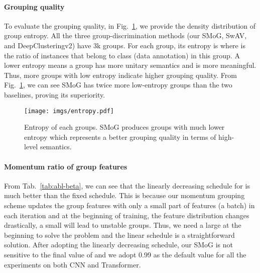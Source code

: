 \documentclass[runningheads]{style/llncs}
\begin{document}
\paragraph{Grouping quality} To evaluate the grouping quality, in Fig.~\ref{fig:entropy}, we provide the density distribution of group entropy. All the three group-discrimination methods (our SMoG, SwAV, and DeepClusteringv2) have 3k groups. For each group, its entropy is  where  is the ratio of instances that belong to class  (data annotation) in this group. A lower entropy means a group has more unitary semantics and is more meaningful. Thus, more groups with low entropy indicate higher grouping quality. From Fig.~\ref{fig:entropy}, we can see SMoG has twice more low-entropy groups than the two baselines, proving its superiority.

\begin{figure}
	\begin{center}
		\texttt{[image: imgs/entropy.pdf]}
	\end{center}
	\caption{Entropy of each groups. SMoG produces groups with much lower entropy which represents a better grouping quality in terms of high-level semantics.}
	\label{fig:entropy}
\end{figure}

\paragraph{Momentum ratio  of group features}
From Tab.~\ref{tab:abl-beta}, we can see that the linearly decreasing schedule for  is much better than the fixed schedule. This is because our momentum grouping scheme updates the group features with only a small part of features (a batch) in each iteration and at the beginning of training, the feature distribution changes drastically, a small  will lead to unstable groups. Thus, we need a large  at the beginning to solve the problem and the linear schedule is a straightforward solution. After adopting the linearly decreasing schedule, our SMoG is not sensitive to the final value of  and we adopt 0.99 as the default value for all the experiments on both CNN and Transformer.
\end{document}
